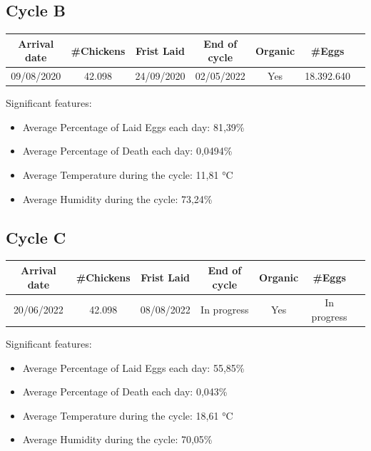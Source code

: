 \documentclass[11pt]{article}
\begin{document}
\subsection{Cycle B}
\begin{center}
    \begin{tabular}{| c | c | c | c | c | c | c |} 
        \hline
        Arrival date & \#Chickens & Frist Laid & End of cycle & Organic & \#Eggs\\ [0.5ex] 
        \hline
        09/08/2020 & 42.098 & 24/09/2020 & 02/05/2022 & Yes & 18.392.640\\ 
        \hline
    \end{tabular}
\end{center}

Significant features:
\begin{itemize}
    \item Average Percentage of Laid Eggs each day: 81,39\%
    \item Average Percentage of Death each day: 0,0494\%
    \item Average Temperature during the cycle: 11,81 °C
    \item Average Humidity during the cycle: 73,24\%
\end{itemize}

\subsection{Cycle C}
\begin{center}
    \begin{tabular}{| c | c | c | c | c | c | c |} 
        \hline
        Arrival date & \#Chickens & Frist Laid & End of cycle & Organic & \#Eggs\\ [0.5ex] 
        \hline
        20/06/2022 & 42.098 & 08/08/2022 & In progress & Yes & In progress\\ 
        \hline
    \end{tabular}
\end{center}

Significant features:
\begin{itemize}
    \item Average Percentage of Laid Eggs each day: 55,85\%
    \item Average Percentage of Death each day: 0,043\%
    \item Average Temperature during the cycle: 18,61 °C
    \item Average Humidity during the cycle: 70,05\%
\end{itemize}
\end{document}

